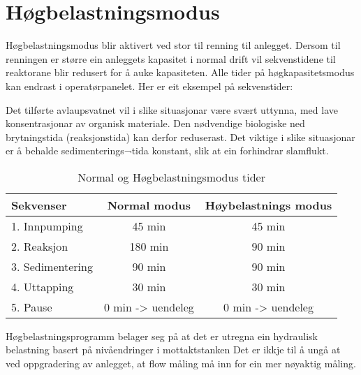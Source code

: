 \newpage
\section{Høgbelastningsmodus}

Høgbelastningsmodus blir aktivert ved stor til renning til anlegget. 
Dersom til renningen er større ein anleggets kapasitet i normal drift vil sekvenstidene til reaktorane blir redusert for å auke kapasiteten. 
Alle tider på høgkapasitetsmodus kan endrast i operatørpanelet.
Her er eit eksempel på sekvenstider:

Det tilførte avlaupsvatnet vil i slike situasjonar være svært uttynna, med lave konsentrasjonar av organisk materiale.
Den nødvendige biologiske ned brytningstida (reaksjonstida) kan derfor reduserast. 
Det viktige i slike situasjonar er å behalde sedimenterings¬tida konstant, slik at ein forhindrar slamflukt.

\begin{table}[h]
    \centering
    \begin{tabular}{|l|c|c|}
    \hline
        \rowcolor{myblack} %
        \textcolor{purewhite}{Sekvenser} & \textcolor{purewhite}{Normal modus} & \textcolor{purewhite}{Høybelastnings modus} \\ \hline
        \rowcolor{lightgray} 1. Innpumping & 45 min & 45 min \\ \hline
        \rowcolor{purewhite} 2. Reaksjon & 180 min & 90 min \\ \hline 
        \rowcolor{lightgray} 3. Sedimentering & 90 min & 90 min \\ \hline
        \rowcolor{purewhite} 4. Uttapping & 30 min & 30 min \\ \hline
        \rowcolor{lightgray} 5. Pause & 0 min -> uendeleg & 0 min -> uendeleg  \\ \hline
    \end{tabular}
    \caption{Normal og Høgbelastningsmodus tider}\label{table:Normal Og Høgbelastningsmodus}
\end{table}

Høgbelastningsprogramm belager seg på at det er utregna ein hydraulisk belastning basert på nivåendringer i mottaktstanken
Det er ikkje til å ungå at ved oppgradering av anlegget, at flow måling må inn for ein mer nøyaktig måling.

